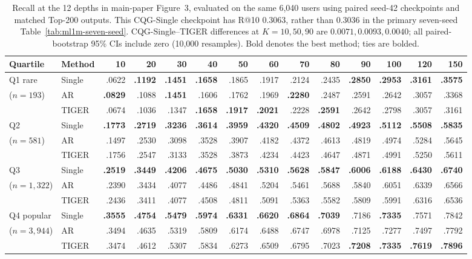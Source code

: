 \documentclass[letterpaper]{article}
\begin{document}
\begin{table}[H]
\centering
\small
\setlength{\tabcolsep}{1.45pt}
\begin{tabular}{llrrrrrrrrrrrr}
\toprule
Quartile & Method & 10 & 20 & 30 & 40 & 50 & 60 & 70 & 80 & 90 & 100 & 120 & 150 \\
\midrule
Q1 rare & Single & .0622 & \textbf{.1192} & \textbf{.1451} & \textbf{.1658} & .1865 & .1917 & .2124 & .2435 & \textbf{.2850} & \textbf{.2953} & \textbf{.3161} & \textbf{.3575} \\
($n=193$) & AR & \textbf{.0829} & .1088 & \textbf{.1451} & .1606 & .1762 & .1969 & \textbf{.2280} & .2487 & .2591 & .2642 & .3057 & .3368 \\
& TIGER & .0674 & .1036 & .1347 & \textbf{.1658} & \textbf{.1917} & \textbf{.2021} & .2228 & \textbf{.2591} & .2642 & .2798 & .3057 & .3161 \\
\midrule
Q2 & Single & \textbf{.1773} & \textbf{.2719} & \textbf{.3236} & \textbf{.3614} & \textbf{.3959} & \textbf{.4320} & \textbf{.4509} & \textbf{.4802} & \textbf{.4923} & \textbf{.5112} & \textbf{.5508} & \textbf{.5835} \\
($n=581$) & AR & .1497 & .2530 & .3098 & .3528 & .3907 & .4182 & .4372 & .4613 & .4819 & .4974 & .5284 & .5645 \\
& TIGER & .1756 & .2547 & .3133 & .3528 & .3873 & .4234 & .4423 & .4647 & .4871 & .4991 & .5250 & .5611 \\
\midrule
Q3 & Single & \textbf{.2519} & \textbf{.3449} & \textbf{.4206} & \textbf{.4675} & \textbf{.5030} & \textbf{.5310} & \textbf{.5628} & \textbf{.5847} & \textbf{.6006} & \textbf{.6188} & \textbf{.6430} & \textbf{.6740} \\
($n=1{,}322$) & AR & .2390 & .3434 & .4077 & .4486 & .4841 & .5204 & .5461 & .5688 & .5840 & .6051 & .6339 & .6566 \\
& TIGER & .2436 & .3411 & .4077 & .4508 & .4811 & .5091 & .5363 & .5582 & .5809 & .5991 & .6316 & .6536 \\
\midrule
Q4 popular & Single & \textbf{.3555} & \textbf{.4754} & \textbf{.5479} & \textbf{.5974} & \textbf{.6331} & \textbf{.6620} & \textbf{.6864} & \textbf{.7039} & .7186 & \textbf{.7335} & .7571 & .7842 \\
($n=3{,}944$) & AR & .3494 & .4635 & .5319 & .5809 & .6174 & .6488 & .6747 & .6978 & .7125 & .7277 & .7497 & .7792 \\
& TIGER & .3474 & .4612 & .5307 & .5834 & .6273 & .6509 & .6795 & .7023 & \textbf{.7208} & \textbf{.7335} & \textbf{.7619} & \textbf{.7896} \\
\bottomrule
\end{tabular}
\caption{Recall at the 12 depths in main-paper Figure~3, evaluated on the
same 6,040 users using paired seed-42 checkpoints and matched Top-200
outputs. This CQG-Single checkpoint has R@10 \(0.3063\), rather than
\(0.3036\) in the primary seven-seed Table~\ref{tab:ml1m-seven-seed}.
CQG-Single--TIGER differences at \(K=10,50,90\) are
\(0.0071,0.0093,0.0040\); all paired-bootstrap 95\% CIs include zero
(10,000 resamples). Bold denotes the best method; ties are bolded.}
\label{tab:crossover}
\end{table}
\end{document}
